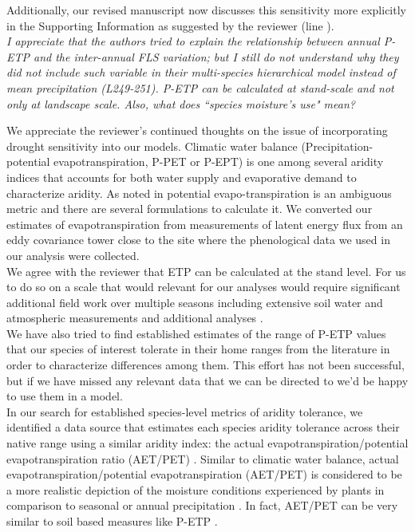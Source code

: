 \documentclass{article}[11pt]
\begin{document}
Additionally, our revised manuscript now discusses this sensitivity more explicitly in the Supporting Information as suggested by the reviewer (line ).\\


\textit{I appreciate that the authors tried to explain the relationship between annual P-ETP and the inter-annual FLS variation; but I still do not understand why they did not include such variable in their multi-species hierarchical model instead of mean precipitation (L249-251). P-ETP can be calculated at stand-scale and not only at landscape scale. Also, what does ``species moisture's use" mean?}

We appreciate the reviewer's continued thoughts on the issue of incorporating drought sensitivity into our models. Climatic water balance (Precipitation-potential evapotranspiration, P-PET or P-EPT) is one among several aridity indices that accounts for both water supply and evaporative demand to characterize aridity. As noted in \citet{Speich:2019aa} potential evapo-transpiration is an ambiguous metric and there are several formulations to calculate it. We converted our estimates of evapotranspiration from measurements of latent energy flux \citep{Knauer2018} from an eddy covariance tower close to the site where the phenological data we used in our analysis were collected.\\

We agree with the reviewer that ETP can be calculated at the stand level. For us to do so on a scale that would relevant for our analyses would require significant additional field work over multiple seasons including extensive soil water and atmospheric measurements and additional analyses \citep{GARNIER:1952aa,Allan:1998aa}.\\ 

We have also tried to find established estimates of the range of P-ETP values that our species of interest tolerate in their home ranges from the literature in order to characterize differences among them. This effort has not been successful, but if we have missed any relevant data that we can be directed to we'd be happy to use them in a model.\\ 

In our search for established species-level metrics of aridity tolerance, we identified a data source that estimates each species aridity tolerance across their native range using a similar aridity index: the actual evapotranspiration/potential evapotranspiration ratio (AET/PET) \citep{Thomspson2012}. Similar to climatic water balance, actual evapotranspiration/potential evapotranspiration (AET/PET) is considered to be a more realistic depiction of the moisture conditions experienced by plants in comparison to seasonal or annual precipitation \citep{Thomspson2012}. In fact, AET/PET can be very similar to soil based measures like  P-ETP \citep{Speich:2019aa}.\\
\end{document}

